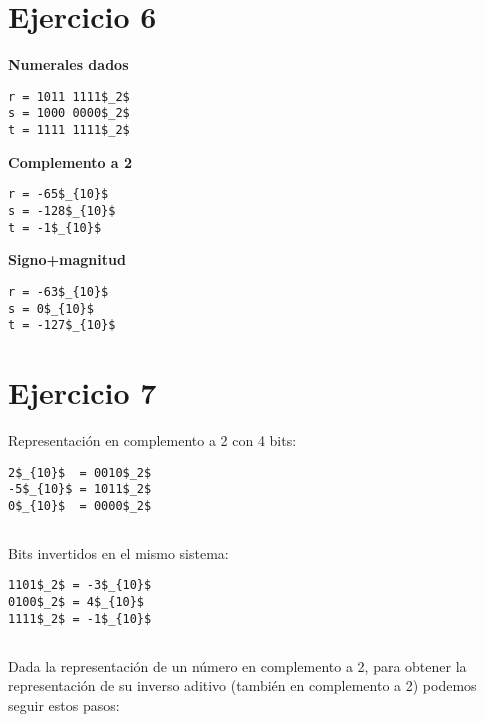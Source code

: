 \section{Ejercicio 6}

\begin{multicols}{3}
\textbf{Numerales dados}
\begin{lstlisting}
r = 1011 1111$_2$
s = 1000 0000$_2$
t = 1111 1111$_2$
\end{lstlisting}

\columnbreak

\textbf{Complemento a 2}
\begin{lstlisting}
r = -65$_{10}$
s = -128$_{10}$
t = -1$_{10}$
\end{lstlisting}

\columnbreak

\textbf{Signo+magnitud}
\begin{lstlisting}
r = -63$_{10}$
s = 0$_{10}$
t = -127$_{10}$
\end{lstlisting}
\end{multicols}

\section{Ejercicio 7}

Representación en complemento a 2 con 4 bits:

\begin{lstlisting}
2$_{10}$  = 0010$_2$
-5$_{10}$ = 1011$_2$
0$_{10}$  = 0000$_2$
\end{lstlisting}

\subsection{}

Bits invertidos en el mismo sistema:

\begin{lstlisting}
1101$_2$ = -3$_{10}$
0100$_2$ = 4$_{10}$
1111$_2$ = -1$_{10}$
\end{lstlisting}

\subsection{}

Dada la representación de un número en complemento a 2, para obtener la representación de su inverso aditivo (también en complemento a 2) podemos seguir estos pasos:

